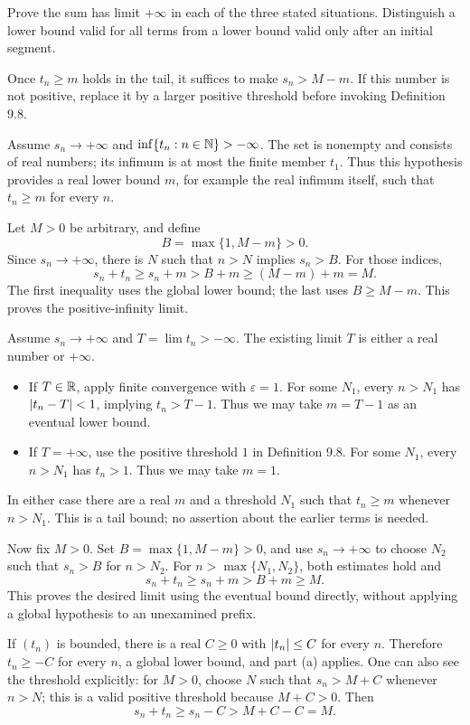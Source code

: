 \goal Prove the sum has limit $+\infty$ in each of the three
stated situations. Distinguish a lower bound valid for all terms
from a lower bound valid only after an initial segment.

\idea Once $t_n\geq m$ holds in the tail, it suffices to make
$s_n>M-m$. If this number is not positive, replace it by a
larger positive threshold before invoking Definition 9.8.

Assume $s_n\to+\infty$ and
$\inf\{t_n:n\in\mathbb{N}\}>-\infty$.
The set is nonempty and consists of real numbers; its infimum
is at most the finite member $t_1$. Thus this hypothesis provides
a real lower bound $m$, for example the real infimum itself,
such that $t_n\geq m$ for every $n$.

Let $M>0$ be arbitrary, and define
\[
 B=\max\{1,M-m\}>0.
\]
Since $s_n\to+\infty$, there is $N$ such that $n>N$
implies $s_n>B$. For those indices,
\[
 s_n+t_n\geq s_n+m>B+m\geq(M-m)+m=M.
\]
The first inequality uses the global lower bound; the last uses
$B\geq M-m$. This proves the positive-infinity limit.

Assume $s_n\to+\infty$ and $T=\lim t_n>-\infty$.
The existing limit $T$ is either a real number or $+\infty$.
\begin{itemize}
 \item If $T\in\mathbb{R}$, apply finite convergence with
       $\varepsilon=1$. For some $N_1$, every $n>N_1$
       has $\left|t_n-T\right|<1$, implying $t_n>T-1$.
       Thus we may take $m=T-1$ as an eventual lower bound.
 \item If $T=+\infty$, use the positive threshold $1$ in
       Definition 9.8. For some $N_1$, every $n>N_1$
       has $t_n>1$. Thus we may take $m=1$.
\end{itemize}
In either case there are a real $m$ and a threshold $N_1$ such
that $t_n\geq m$ whenever $n>N_1$. This is a tail bound;
no assertion about the earlier terms is needed.

Now fix $M>0$. Set $B=\max\{1,M-m\}>0$, and use
$s_n\to+\infty$ to choose $N_2$ such that $s_n>B$
for $n>N_2$. For
$n>\max\{N_1,N_2\}$, both estimates hold and
\[
 s_n+t_n\geq s_n+m>B+m\geq M.
\]
This proves the desired limit using the eventual bound directly,
without applying a global hypothesis to an unexamined prefix.

If $(t_n)$ is bounded, there is a real $C\geq0$ with
$\left|t_n\right|\leq C$ for every $n$. Therefore $t_n\geq-C$
for every $n$, a global lower bound, and part (a) applies.
One can also see the threshold explicitly: for $M>0$, choose
$N$ such that $s_n>M+C$ whenever $n>N$; this is a valid
positive threshold because $M+C>0$. Then
\[
 s_n+t_n\geq s_n-C>M+C-C=M.
\]

